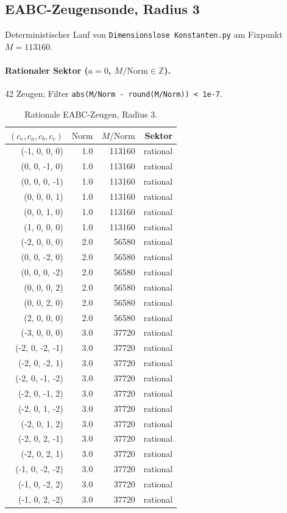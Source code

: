 \subsection{EABC-Zeugensonde, Radius 3}\label{sec:eabc-zeugen-r3}

Deterministischer Lauf von \texttt{Dimensionslose Konstanten.py} am Fixpunkt $M=113160$.

\paragraph{Rationaler Sektor ($a=0$, $M/\mathrm{Norm}\in\mathbb{Z}$).}
42 Zeugen; Filter \texttt{abs(M/Norm - round(M/Norm)) < 1e-7}.

\begin{table}[ht]
  \centering
  \caption{Rationale EABC-Zeugen, Radius 3.}
  \label{tab:eabc-rational-r3}
  \begin{tabular}{rrrr}
    \toprule
    $(c_e,c_a,c_b,c_c)$ & $\mathrm{Norm}$ & $M/\mathrm{Norm}$ & Sektor \\
    \midrule
    (-1, 0, 0, 0) & 1.0 & 113160 & rational \\
    (0, 0, -1, 0) & 1.0 & 113160 & rational \\
    (0, 0, 0, -1) & 1.0 & 113160 & rational \\
    (0, 0, 0, 1) & 1.0 & 113160 & rational \\
    (0, 0, 1, 0) & 1.0 & 113160 & rational \\
    (1, 0, 0, 0) & 1.0 & 113160 & rational \\
    (-2, 0, 0, 0) & 2.0 & 56580 & rational \\
    (0, 0, -2, 0) & 2.0 & 56580 & rational \\
    (0, 0, 0, -2) & 2.0 & 56580 & rational \\
    (0, 0, 0, 2) & 2.0 & 56580 & rational \\
    (0, 0, 2, 0) & 2.0 & 56580 & rational \\
    (2, 0, 0, 0) & 2.0 & 56580 & rational \\
    (-3, 0, 0, 0) & 3.0 & 37720 & rational \\
    (-2, 0, -2, -1) & 3.0 & 37720 & rational \\
    (-2, 0, -2, 1) & 3.0 & 37720 & rational \\
    (-2, 0, -1, -2) & 3.0 & 37720 & rational \\
    (-2, 0, -1, 2) & 3.0 & 37720 & rational \\
    (-2, 0, 1, -2) & 3.0 & 37720 & rational \\
    (-2, 0, 1, 2) & 3.0 & 37720 & rational \\
    (-2, 0, 2, -1) & 3.0 & 37720 & rational \\
    (-2, 0, 2, 1) & 3.0 & 37720 & rational \\
    (-1, 0, -2, -2) & 3.0 & 37720 & rational \\
    (-1, 0, -2, 2) & 3.0 & 37720 & rational \\
    (-1, 0, 2, -2) & 3.0 & 37720 & rational \\
    \bottomrule
  \end{tabular}
\end{table}

